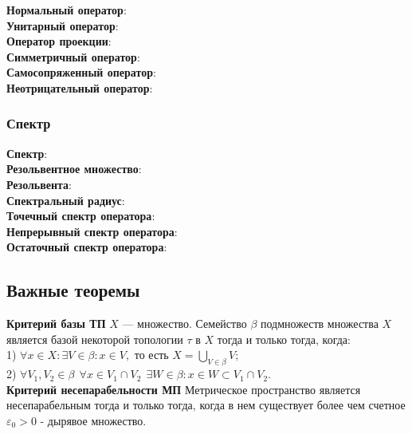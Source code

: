 \documentclass[12pt,a4paper]{scrartcl}
\begin{document}
\textbf{Нормальный оператор}: \\ 

\textbf{Унитарный оператор}: \\ 

\textbf{Оператор проекции}: \\ 

\textbf{Симметричный оператор}: \\ 

\textbf{Самосопряженный оператор}: \\

\textbf{Неотрицательный оператор}: \\ 

\subsubsection*{Спектр}

\textbf{Спектр}: \\ 

\textbf{Резольвентное множество}: \\ 

\textbf{Резольвента}: \\ 

\textbf{Спектральный радиус}: \\ 

\textbf{Точечный спектр оператора}: \\ 

\textbf{Непрерывный спектр оператора}: \\ 

\textbf{Остаточный спектр оператора}: \\ 

\newpage
\subsection*{Важные теоремы}

\textbf{Критерий базы ТП} $X$ — множество. Семейство $\beta$ подмножеств множества $X$ является базой некоторой топологии $\tau$ в $X$ тогда и только тогда, когда: \\
1) $\forall x \in X: \exists V \in \beta: x \in V, \text{ то есть }X = \bigcup\limits_{V \in \beta} V;$\\
2) $\forall V_1, V_2 \in \beta \ \ \forall x \in V_1 \cap V_2 \ \ \exists W \in \beta: x \in W \subset V_1 \cap V_2.$\\

\textbf{Критерий несепарабельности МП} Метрическое пространство является несепарабельным тогда и только тогда, когда в нем существует более чем счетное $\varepsilon_0 > 0$ - дырявое множество. \\
\end{document}
